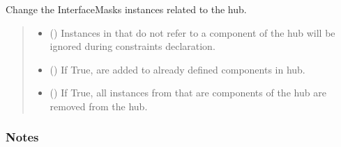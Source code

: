 \documentclass[letterpaper,10pt,english]{sphinxmanual}
\begin{document}
\begin{fulllineitems}
\begin{fulllineitems}
\end{fulllineitems}


\begin{fulllineitems}
\label{\detokenize{generated/tamos.Hub:tamos.Hub.change_interface_masks}}
\pysigstartsignatures
{}
\pysigstopsignatures
\sphinxAtStartPar
Change the InterfaceMasks instances related to the hub.
\begin{quote}\begin{description}
\begin{itemize}
\item {} 
\sphinxAtStartPar
{} () \textendash{} Instances in  that do not refer to a component of the hub will be ignored during constraints declaration.

\item {} 
\sphinxAtStartPar
{} (\sphinxstyleliteralemphasis{\sphinxupquote{, }}) \textendash{} If True,  are added to already defined components in hub.

\item {} 
\sphinxAtStartPar
{} (\sphinxstyleliteralemphasis{\sphinxupquote{, }}) \textendash{} If True, all instances from  that are components of the hub are removed from the hub.

\end{itemize}

\end{description}\end{quote}
\subsubsection*{Notes}


\end{fulllineitems}
\end{fulllineitems}
\end{document}
